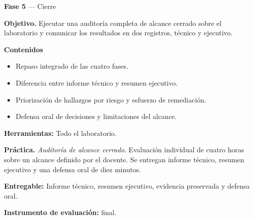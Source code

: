 \documentclass[11pt,a4paper]{article}
\begin{document}
\begin{tcolorbox}[cajaContenido,title={Semana 10 --- Evaluación final práctica de alcance cerrado}]
\textbf{Fase 5} --- Cierre

\textbf{Objetivo.} Ejecutar una auditoría completa de alcance cerrado sobre el laboratorio y comunicar los resultados en dos registros, técnico y ejecutivo.

\textbf{Contenidos}

\begin{itemize}[leftmargin=1.4em,itemsep=2pt,topsep=3pt]
  \item Repaso integrado de las cuatro fases.
  \item Diferencia entre informe técnico y resumen ejecutivo.
  \item Priorización de hallazgos por riesgo y esfuerzo de remediación.
  \item Defensa oral de decisiones y limitaciones del alcance.
\end{itemize}

\textbf{Herramientas:} Todo el laboratorio.

\textbf{Práctica.} \emph{Auditoría de alcance cerrado}. Evaluación individual de cuatro horas sobre un alcance definido por el docente. Se entregan informe técnico, resumen ejecutivo y una defensa oral de diez minutos.


\textbf{Entregable:} Informe técnico, resumen ejecutivo, evidencia preservada y defensa oral.

\textbf{Instrumento de evaluación:} final.
\end{tcolorbox}
\end{document}
